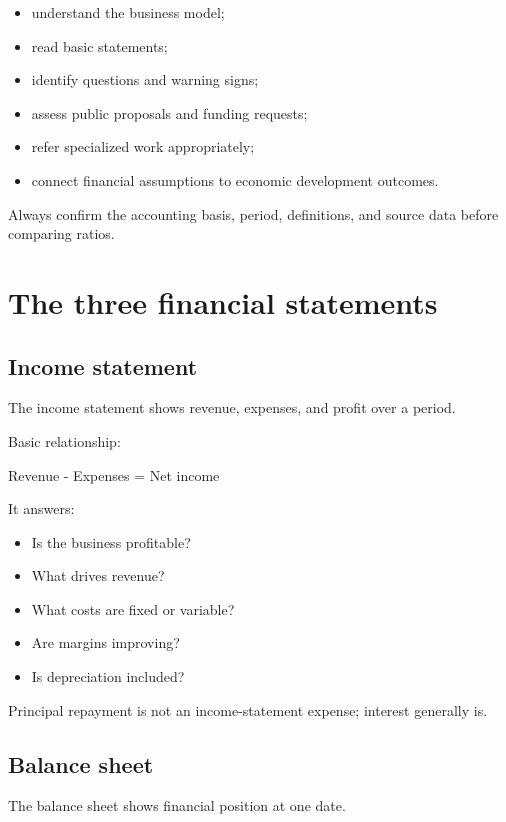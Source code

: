 \documentclass[11pt,letterpaper,oneside,openany]{book}
\begin{document}
\begin{itemize}
\item understand the business model;
\item read basic statements;
\item identify questions and warning signs;
\item assess public proposals and funding requests;
\item refer specialized work appropriately;
\item connect financial assumptions to economic development outcomes.
\end{itemize}


Always confirm the accounting basis, period, definitions, and source data before comparing ratios.


\section[The three financial statements]{The three financial statements}
\subsection[Income statement]{Income statement}
The income statement shows revenue, expenses, and profit over a period.


Basic relationship:


\begin{guidequote}
Revenue - Expenses = Net income

\end{guidequote}


It answers:


\begin{itemize}
\item Is the business profitable?
\item What drives revenue?
\item What costs are fixed or variable?
\item Are margins improving?
\item Is depreciation included?
\end{itemize}


Principal repayment is not an income-statement expense; interest generally is.


\subsection[Balance sheet]{Balance sheet}
The balance sheet shows financial position at one date.
\end{document}
